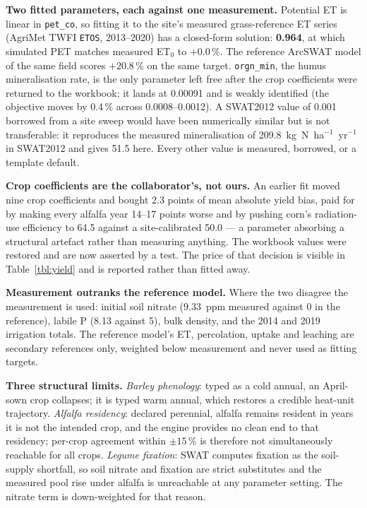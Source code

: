 \documentclass[a4paper,fleqn]{cas-sc}
\begin{document}
\textbf{Two fitted parameters, each against one measurement.} Potential ET is linear in
\texttt{pet\_co}, so fitting it to the site's measured grass-reference ET series
(AgriMet TWFI \texttt{ETOS}, 2013--2020) has a closed-form solution: \textbf{0.964}, at which
simulated PET matches measured ET$_0$ to $+0.0$\,\%. The reference ArcSWAT model of the
same field scores $+20.8$\,\% on the same target. \texttt{orgn\_min}, the humus
mineralisation rate, is the only parameter left free after the crop coefficients were
returned to the workbook; it lands at 0.00091 and is weakly identified (the objective
moves by 0.4\,\% across 0.0008--0.0012). A SWAT2012 value of 0.001 borrowed from a site
sweep would have been numerically similar but is not transferable: it reproduces the
measured mineralisation of 209.8~kg~N~ha$^{-1}$~yr$^{-1}$ in SWAT2012 and gives
51.5 here. Every other value is measured, borrowed, or a template default.

\textbf{Crop coefficients are the collaborator's, not ours.} An earlier fit moved nine crop
coefficients and bought 2.3 points of mean absolute yield bias, paid for by making every
alfalfa year 14--17 points worse and by pushing corn's radiation-use efficiency to 64.5
against a site-calibrated 50.0 --- a parameter absorbing a structural artefact rather than
measuring anything. The workbook values were restored and are now asserted by a test.
The price of that decision is visible in Table~\ref{tbl:yield} and is reported rather
than fitted away.

\textbf{Measurement outranks the reference model.} Where the two disagree the measurement
is used: initial soil nitrate (9.33~ppm measured against 0 in the reference), labile P
(8.13 against 5), bulk density, and the 2014 and 2019 irrigation totals. The reference
model's ET, percolation, uptake and leaching are secondary references only, weighted
below measurement and never used as fitting targets.

\textbf{Three structural limits.} \emph{Barley phenology}: typed as a cold annual, an
April-sown crop collapses; it is typed warm annual, which restores a credible heat-unit
trajectory. \emph{Alfalfa residency}: declared perennial, alfalfa remains resident in
years it is not the intended crop, and the engine provides no clean end to that
residency; per-crop agreement within $\pm 15$\,\% is therefore not simultaneously
reachable for all crops. \emph{Legume fixation}: SWAT computes fixation as the soil-supply
shortfall, so soil nitrate and fixation are strict substitutes and the measured pool rise
under alfalfa is unreachable at any parameter setting. The nitrate term is down-weighted
for that reason.
\end{document}
